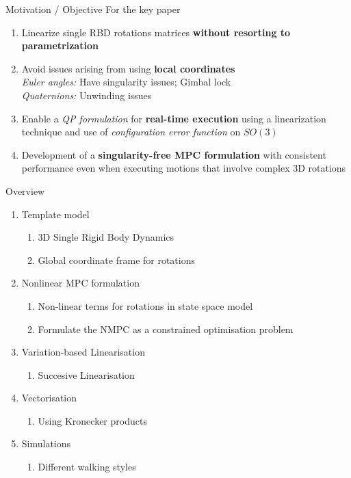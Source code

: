 \documentclass{beamer}
\begin{document}
\begin{frame}{Motivation / Objective}
        For the key paper

	\begin{enumerate}
		\item Linearize single RBD rotations matrices \textbf{without resorting to parametrization}
		\item Avoid issues arising from using \textbf{local coordinates}\\
		      \textit{Euler angles:} Have singularity issues; Gimbal lock\\
		      \textit{Quaternions:} Unwinding issues
		\item Enable a \textit{QP formulation} for \textbf{real-time execution} using a linearization  technique and use of \textit{configuration error function} on $SO(3)$
		\item Development of a \textbf{singularity-free MPC formulation} with consistent performance even when executing motions that involve complex 3D rotations
	\end{enumerate}
\end{frame}


\begin{frame}{Overview}
	

	\setlength{\itemsep}{1em}
	\setlength{\parskip}{2pt}
	\begin{enumerate}\small
		\item Template model
		      \begin{enumerate}\scriptsize
		      	\item 3D Single Rigid Body Dynamics
		      	\item Global coordinate frame for rotations
		      \end{enumerate}
		\item Nonlinear MPC formulation
		      \begin{enumerate}\scriptsize
		      	\item Non-linear terms for rotations in state space model
		      	\item Formulate the NMPC as a constrained optimisation problem
		      \end{enumerate}
		\item Variation-based Linearisation
		      \begin{enumerate}\scriptsize
		      	\item Succesive Linearisation
		      \end{enumerate}
		\item Vectorisation
		      \begin{enumerate}\scriptsize
		      	\item Using Kronecker products
		      \end{enumerate}
		\item Simulations
		      \begin{enumerate}\scriptsize
		      	\item Different walking styles
		      \end{enumerate}
	\end{enumerate}
\end{frame}
\end{document}
